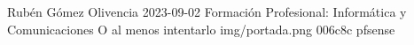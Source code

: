 \documentclass{\ClassPath/yukibook}
\begin{document}
    {Rubén Gómez Olivencia}  %
    {2023-09-02}    %
    {Formación Profesional: \linebreak Informática y Comunicaciones} %
    {O al menos intentarlo} %
    {} %
    {img/portada.png} %
    {006c8c}
    {pfsense} %

    \coverpage
    \graphicspath{{../../yukibook.cls/}}
    \licensepage

    \tableofcontents

    \graphicspath{{img/doc/}}
    
\end{document}
